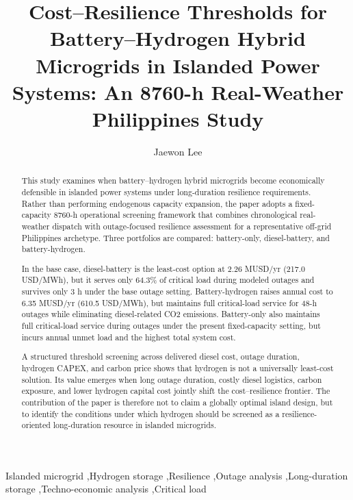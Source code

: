 \documentclass[preprint,12pt]{elsarticle}
\begin{document}
\begin{frontmatter}

\title{Cost–Resilience Thresholds for Battery–Hydrogen Hybrid Microgrids in Islanded Power Systems: An 8760-h Real-Weather Philippines Study}

\author{Jaewon Lee}
\address{National Institute of Green Technology, Republic of Korea}

\begin{abstract}
This study examines when battery–hydrogen hybrid microgrids become economically defensible in islanded power systems under long-duration resilience requirements. Rather than performing endogenous capacity expansion, the paper adopts a fixed-capacity 8760-h operational screening framework that combines chronological real-weather dispatch with outage-focused resilience assessment for a representative off-grid Philippines archetype. Three portfolios are compared: battery-only, diesel-battery, and battery-hydrogen.

In the base case, diesel-battery is the least-cost option at 2.26 MUSD/yr (217.0 USD/MWh), but it serves only 64.3\% of critical load during modeled outages and survives only 3 h under the base outage setting. Battery-hydrogen raises annual cost to 6.35 MUSD/yr (610.5 USD/MWh), but maintains full critical-load service for 48-h outages while eliminating diesel-related CO2 emissions. Battery-only also maintains full critical-load service during outages under the present fixed-capacity setting, but incurs annual unmet load and the highest total system cost.

A structured threshold screening across delivered diesel cost, outage duration, hydrogen CAPEX, and carbon price shows that hydrogen is not a universally least-cost solution. Its value emerges when long outage duration, costly diesel logistics, carbon exposure, and lower hydrogen capital cost jointly shift the cost–resilience frontier. The contribution of the paper is therefore not to claim a globally optimal island design, but to identify the conditions under which hydrogen should be screened as a resilience-oriented long-duration resource in islanded microgrids.
\end{abstract}

\begin{keyword}
Islanded microgrid \sep Hydrogen storage \sep Resilience \sep Outage analysis \sep Long-duration storage \sep Techno-economic analysis \sep Critical load
\end{keyword}

\end{frontmatter}
\end{document}
